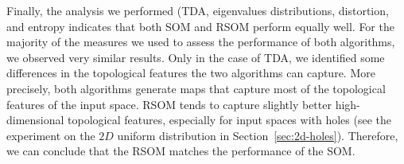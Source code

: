 Finally, the analysis we performed (TDA, eigenvalues distributions, distortion, and entropy indicates that both SOM and RSOM perform equally well. For the majority of the measures we used to assess the performance of both algorithms, we observed very similar results. Only in the case of TDA, we identified some differences in the topological features the two algorithms can capture. More precisely, both algorithms generate maps that capture most of the topological features of the input space. RSOM tends to capture slightly better high-dimensional topological features, especially for input spaces with holes (see the experiment on the $2D$ uniform distribution in Section~\ref{sec:2d-holes}). Therefore, we can conclude that the RSOM matches the performance of the SOM.






